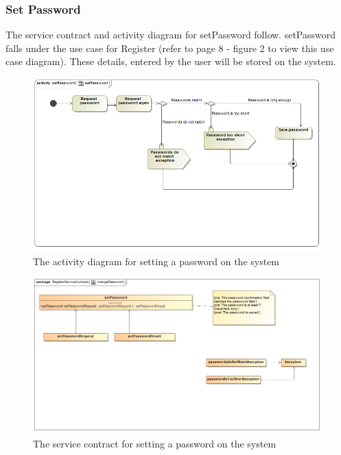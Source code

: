 \documentclass[a4paper,12pt]{report}
\begin{document}
\subsubsection{Set Password}
The service contract and activity diagram for setPassword follow. setPassword falls under the use case for Register (refer to page 8 - figure 2 to view this use case diagram). These details, entered by the user will be stored on the system.
\begin{figure}[H]
  \centering
    \includegraphics[width=1.0\textwidth]{../Diagrams/Register/ActivityDiagrams/setPassword1.png}
    \caption{The activity diagram for setting a password on the system} 
\end{figure}
\begin{figure}[H]
  \centering
    \includegraphics[width=1.0\textwidth]{../Diagrams/Register/ServiceContractsRegister/changePasswordServiceContract.png}
    \caption{The service contract for setting a password on the system} 
\end{figure}
\end{document}
